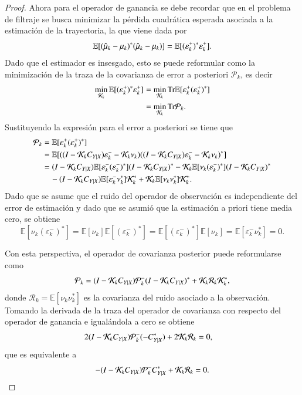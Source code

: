 \begin{proof}
Ahora para el operador de ganancia se debe recordar que en el problema de filtraje se busca minimizar la pérdida cuadrática esperada asociada a la estimación de la trayectoria, la que viene dada por
\begin{equation*}
    \mathbb{E}[(\hat{\mu}_{k} - \mu_{k})^* (\hat{\mu}_{k} - \mu_{k}) ] = \mathbb{E} [ (\varepsilon_k^+)^* \varepsilon_k^+ ].
\end{equation*}
Dado que el estimador es insesgado, esto se puede reformular como la minimización de la traza de la covarianza de error a posteriori $\mathcal{P}_k$, es decir
\begin{align*}
\min_{\mathcal{K}_k} \mathbb{E}[(\varepsilon_k^+)^* \varepsilon_k^+] &= \min_{\mathcal{K}_k} \text{Tr} \mathbb{E}[\varepsilon_k^+(\varepsilon_k^+)^*] \\
&= \min_{\mathcal{K}_k} \text{Tr} \mathcal{P}_{k}.
\end{align*}
Sustituyendo la expresión para el error a posteriori se tiene que
\begin{align*}
\mathcal{P}_k &= \mathbb{E}[\varepsilon^+_k(\varepsilon^+_k)^*] \\
&= \mathbb{E}[((I - \mathcal{K}_k C_{Y|X})\varepsilon^-_k - \mathcal{K}_k \nu_k)((I - \mathcal{K}_k C_{Y|X})\varepsilon^-_k - \mathcal{K}_k \nu_k)^*] \\
&= (I - \mathcal{K}_k C_{Y|X})\mathbb{E}[\varepsilon^-_k(\varepsilon^-_k)^*](I - \mathcal{K}_k C_{Y|X})^* 
- \mathcal{K}_k\mathbb{E}[\nu_k(\varepsilon^-_k)^*](I - \mathcal{K}_k C_{Y|X})^* \\
&\quad - (I - \mathcal{K}_k C_{Y|X})\mathbb{E}[\varepsilon^-_k\nu_k^*]\mathcal{K}_k^* + \mathcal{K}_k\mathbb{E}[\nu_k\nu_k^*]\mathcal{K}_k^*.
\end{align*}
Dado que se asume que el ruido del operador de observación es independiente del error de estimación y dado que se asumió que la estimación a priori tiene media cero, se obtiene
\begin{equation*}
\mathbb{E}[\nu_k(\varepsilon^-_k)^*] = \mathbb{E}[\nu_k]\mathbb{E}[(\varepsilon^-_k)^*] = \mathbb{E}[(\varepsilon^-_k)^*]\mathbb{E}[\nu_k] = \mathbb{E}[\varepsilon^-_k\nu_k^*] = 0.
\end{equation*}

Con esta perspectiva, el operador de covarianza posterior puede reformularse como
\begin{equation*}
\mathcal{P}_k = (I - \mathcal{K}_k C_{Y|X})\mathcal{P}^-_{k}(I - \mathcal{K}_k C_{Y|X})^* + \mathcal{K}_k \mathcal{R}_k \mathcal{K}_k^*,
\end{equation*}
donde $\mathcal{R}_k = \mathbb{E}[\nu_k\nu_k^*]$ es la covarianza del ruido asociado a la observación. Tomando la derivada de la traza del operador de covarianza con respecto del operador de ganancia e igualándola a cero se obtiene
\begin{align*}
2(I - \mathcal{K}_k C_{Y|X})\mathcal{P}^-_{k}(-C_{Y|X}^*) + 2\mathcal{K}_k \mathcal{R}_k &= 0,
\end{align*}
que es equivalente a 
\begin{equation}
    -(I - \mathcal{K}_k C_{Y|X})\mathcal{P}^-_{k}C_{Y|X}^* + \mathcal{K}_k \mathcal{R}_k = 0.
    \label{eq:kalman_gain_rel}
\end{equation}


\end{proof}
